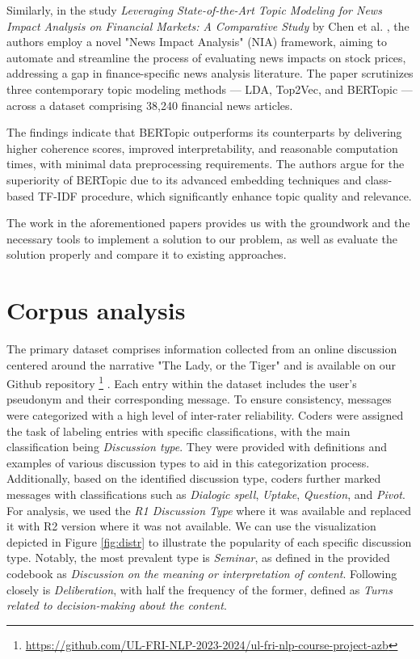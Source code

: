 \documentclass[fleqn,moreauthors,10pt]{ds_report}
\begin{document}
Similarly, in the study \textit{Leveraging State-of-the-Art Topic Modeling for News Impact Analysis on Financial Markets: A Comparative Study} by Chen et al. \cite{NIAframework}, the authors employ a novel "News Impact Analysis" (NIA) framework, aiming to automate and streamline the process of evaluating news impacts on stock prices, addressing a gap in finance-specific news analysis literature. The paper scrutinizes three contemporary topic modeling methods — LDA, Top2Vec, and BERTopic — across a dataset comprising 38,240 financial news articles. 

The findings indicate that BERTopic outperforms its counterparts by delivering higher coherence scores, improved interpretability, and reasonable computation times, with minimal data preprocessing requirements. The authors argue for the superiority of BERTopic due to its advanced embedding techniques and class-based TF-IDF procedure, which significantly enhance topic quality and relevance.

The work in the aforementioned papers provides us with the groundwork and the necessary tools to implement a solution to our problem, as well as evaluate the solution properly and compare it to existing approaches. 

\section*{Corpus analysis}
The primary dataset comprises information collected from an online discussion centered around the narrative "The Lady, or the Tiger" and is available on our Github repository \footnote{\url{https://github.com/UL-FRI-NLP-2023-2024/ul-fri-nlp-course-project-azb}}
. Each entry within the dataset includes the user's pseudonym and their corresponding message. To ensure consistency, messages were categorized with a high level of inter-rater reliability. Coders were assigned the task of labeling entries with specific classifications, with the main classification being \textit{Discussion type}. They were provided with definitions and examples of various discussion types to aid in this categorization process. Additionally, based on the identified discussion type, coders further marked messages with classifications such as \textit{Dialogic spell}, \textit{Uptake}, \textit{Question}, and \textit{Pivot}. For analysis, we used the \textit{R1 Discussion Type} where it was available and replaced it with R2 version where it was not available. We can use the visualization depicted in Figure \ref{fig:distr} to illustrate the popularity of each specific discussion type. Notably, the most prevalent type is \textit{Seminar}, as defined in the provided codebook as \textit{Discussion on the meaning or interpretation of content}. Following closely is \textit{Deliberation}, with half the frequency of the former, defined as \textit{Turns related to decision-making about the content}.
\end{document}
